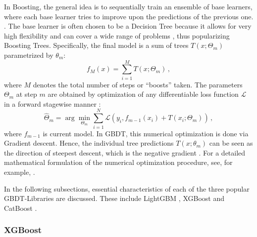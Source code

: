 In Boosting, the general idea is to sequentially train an ensemble of base learners, where each base learner tries to improve upon the predictions of the previous one. \parencite[337]{hastie_elements_2009}. The base learner is often chosen to be a Decision Tree because it allows for very high flexibility and can cover a wide range of problems \parencite[350--352]{hastie_elements_2009}, thus popularizing Boosting Trees. Specifically, the final model is a sum of trees $T(x; \Theta_m)$ parametrized by $\theta_m$:
\begin{equation}
    f_M(x) = \sum_{i = 1}^M T(x; \Theta_m) \, ,
\end{equation}
where $M$ denotes the total number of steps or \enquote{boosts} taken. The parameters $\Theta_m$ at step $m$ are obtained by optimization of any differentiable loss function $\mathcal{L}$ in a forward stagewise manner \parencite[356--357]{hastie_elements_2009}:
\begin{equation}
    \label{eq:GBDT-optimization}
    \hat{\Theta}_m=\arg \min _{\Theta_m} \sum_{i=1}^N \mathcal{L}\left(y_i, f_{m-1}(x_i)+T(x_i ; \Theta_m)\right) \, ,
\end{equation}
where $f_{m-1}$ is current model.
In GBDT, this numerical optimization is done via Gradient descent. Hence, the individual tree predictions $T(x; \theta_m)$ can be seen as the direction of steepest descent, which is the negative gradient \parencite[359]{hastie_elements_2009}. For a detailed mathematical formulation of the numerical optimization procedure, see, for example, \cites[1189--1193]{friedman_greedy_2001}[353--360]{hastie_elements_2009}.

In the following subsections, essential characteristics of each of the three popular GBDT-Libraries are discussed. These include LightGBM \parencite{ke_lightgbm_2017}, XGBoost \parencite{chen_xgboost_2016}  and CatBoost \parencite{prokhorenkova_catboost_2017}.

\subsubsection{XGBoost}

